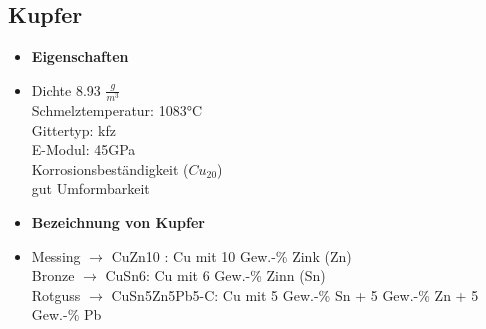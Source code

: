 \documentclass[12pt,twocolumn]{article}
\begin{document}
    \subsection{Kupfer}
    \begin{minipage}[t]{0.5\columnwidth}
        \begin{itemize}[label={}, leftmargin=*, itemsep=0.01em]
            \item \textbf{Eigenschaften}
            \item Dichte 8.93 $\frac{g}{m^3}$\\ Schmelztemperatur: 1083°C \\ Gittertyp: kfz \\ E-Modul: 45GPa \\  Korrosionsbeständigkeit ($Cu_20$)\\ gut Umformbarkeit
        \end{itemize}
    \end{minipage}\hfill
    \begin{minipage}[t]{0.5\columnwidth}
        \begin{itemize}[label={}, leftmargin=*,  itemsep=0.01em]
            \item \textbf{Bezeichnung von Kupfer} 
            \item Messing $\rightarrow$ CuZn10 : Cu mit 10 Gew.-\% Zink (Zn) \\ Bronze $\rightarrow$ CuSn6: Cu mit 6 Gew.-\% Zinn (Sn) \\ Rotguss $\rightarrow$ CuSn5Zn5Pb5-C: Cu mit 5 Gew.-\% Sn + 5 Gew.-\% Zn + 5 Gew.-\% Pb
        \end{itemize} 
    \end{minipage}\hfill
\end{document}
